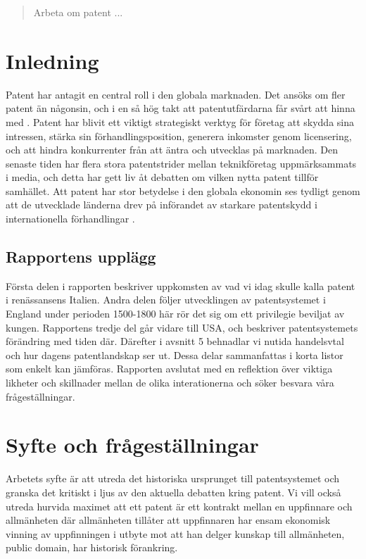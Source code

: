 
\begin{abstract}
	Arbeta om patent ...
\end{abstract}	
	
	
\section{Inledning}

Patent har antagit en central roll i den globala marknaden.
Det ansöks om fler patent än någonsin, och i en så hög takt att patentutfärdarna
får svårt att hinna med \cite{uspto_number}.
Patent har blivit ett viktigt strategiskt verktyg för företag att skydda sina
intressen, stärka sin förhandlingsposition, generera inkomster genom
licensering, och att hindra konkurrenter från att äntra och utvecklas på
marknaden. 
Den senaste tiden har flera stora patentstrider mellan teknikföretag
uppmärksammats i media, och detta har gett liv åt debatten om vilken nytta
patent tillför samhället.
Att patent har stor betydelse i den globala ekonomin ses tydligt genom att
de utvecklade länderna drev på införandet av starkare patentskydd i
internationella förhandlingar \cite{}. 

\subsection{Rapportens upplägg}

Första delen i rapporten beskriver
uppkomsten av vad vi idag skulle kalla patent i renässansens Italien.
Andra delen följer utvecklingen av patentsystemet i England under perioden
1500-1800 här rör det sig om ett privilegie beviljat av kungen. Rapportens tredje del går vidare till USA, och beskriver patentsystemets förändring med tiden där. Därefter i avsnitt 5 behnadlar vi nutida handelsvtal och hur dagens patentlandskap ser ut. Dessa delar sammanfattas i korta listor som enkelt kan jämföras. Rapporten avslutat med en reflektion över viktiga likheter och skillnader mellan de olika interationerna och söker besvara våra frågeställningar. 


\section{Syfte och frågeställningar}

Arbetets syfte är att utreda det historiska ursprunget till patentsystemet och
granska det kritiskt i ljus av den aktuella debatten kring patent.
Vi vill också utreda hurvida maximet att ett patent är ett kontrakt mellan en
uppfinnare och allmänheten där allmänheten tillåter att uppfinnaren har ensam
ekonomisk vinning av uppfinningen i utbyte mot att han delger kunskap till
allmänheten, public domain, har historisk förankring.

